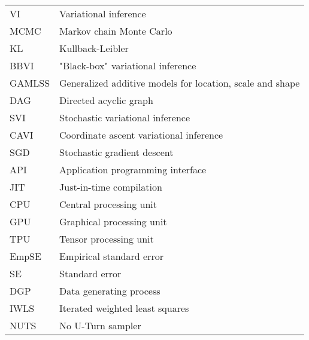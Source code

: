 \begin{tabular}{@{} l @{\hskip 1in} l}
  VI & Variational inference \\
  MCMC & Markov chain Monte Carlo \\
  KL & Kullback-Leibler \\
  BBVI & "Black-box" variational inference \\
  GAMLSS & Generalized additive models for location, scale and shape \\
  DAG & Directed acyclic graph \\ 
  SVI & Stochastic variational inference \\
  CAVI & Coordinate ascent variational inference \\
  SGD & Stochastic gradient descent \\
  API & Application programming interface \\
  JIT & Just-in-time compilation \\
  CPU & Central processing unit \\
  GPU & Graphical processing unit \\
  TPU & Tensor processing unit \\
  EmpSE & Empirical standard error \\
  SE & Standard error \\
  DGP & Data generating process \\
  IWLS & Iterated weighted least squares \\
  NUTS & No U-Turn sampler \\
\end{tabular}
